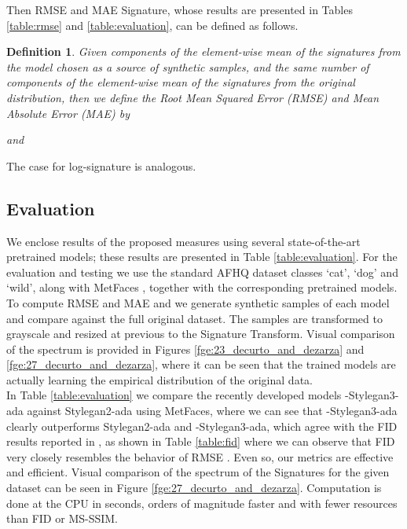\documentclass[lettersize,journal]{IEEEtran}
\newtheorem{definition}{Definition}
\begin{document}
Then RMSE and MAE Signature, whose results are presented in Tables \ref{table:rmse} and \ref{table:evaluation}, can be defined as follows.

\begin{definition}
    Given  components of the element-wise mean of the signatures  from the model chosen as a source of synthetic samples, and the same number of components of the element-wise mean of the signatures  from the original distribution, then we define the Root Mean Squared Error (RMSE) and Mean Absolute Error (MAE) by
    
	and
    
\end{definition}
The case for log-signature is analogous.

\subsection{Evaluation}
We enclose results of the proposed measures using several state-of-the-art pretrained models; these results are presented in Table \ref{table:evaluation}. For the evaluation and testing we use the standard AFHQ dataset \cite{Choi2020} classes `cat', `dog' and `wild', along with MetFaces \cite{Karras2020}, together with the corresponding pretrained models. To compute RMSE and MAE  and  we generate  synthetic samples of each model and compare against the full original dataset. The samples are transformed to grayscale and resized at  previous to the Signature Transform. Visual comparison of the spectrum is provided in Figures \ref{fge:23_decurto_and_dezarza} and \ref{fge:27_decurto_and_dezarza}, where it can be seen that the trained models are actually learning the empirical distribution of the original data.\\

In Table \ref{table:evaluation} we compare the recently developed models -Stylegan3-ada \cite{Karras2021} against Stylegan2-ada using MetFaces, where we can see that -Stylegan3-ada clearly outperforms Stylegan2-ada and -Stylegan3-ada, which agree with the FID results reported in \cite{Karras2021}, as shown in Table \ref{table:fid} where we can observe that FID very closely resembles the behavior of RMSE . Even so, our metrics are effective and efficient. Visual comparison of the spectrum of the Signatures for the given dataset can be seen in Figure \ref{fge:27_decurto_and_dezarza}. Computation is done at the CPU in seconds, orders of magnitude faster and with fewer resources than FID or MS-SSIM.
\end{document}
